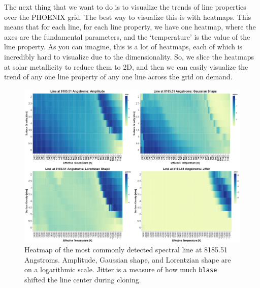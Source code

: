 \documentclass[twocolumn]{aastex631}
\begin{document}
The next thing that we want to do is to visualize the trends of line properties over
the PHOENIX grid. The best way to visualize this is with heatmaps. This means that for
each line, for each line property, we have one heatmap, where the axes are the fundamental
parameters, and the `temperature' is the value of the line property. As you can imagine, this
is a lot of heatmaps, each of which is incredibly hard to visualize due to the dimensionality.
So, we slice the heatmaps at solar metallicity to reduce them to 2D, and then we can easily
visualize the trend of any one line property of any one line across the grid on demand.

\begin{figure}
    \includegraphics[width=\textwidth]{images/heatmap0.png}
    \caption{Heatmap of the most commonly detected spectral line at 8185.51 Angstroms. Amplitude,
    Gaussian shape, and Lorentzian shape are on a logarithmic scale. Jitter is a measure of how 
    much \texttt{blase} shifted the line center during cloning.}
\end{figure}
\end{document}
